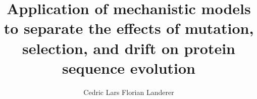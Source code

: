 \documentclass[dissertation,letterpaper,12pt]{utthesis} %
\title{Application of mechanistic models to separate the effects of mutation, selection, and drift on protein sequence evolution}	       	%
\author{Cedric Lars Florian Landerer}                			%
\begin{document}
  \newcommand{\package}{\textbf{AnaCoDa}\xspace} %
  \newcommand{\kluyveri}{\textit{L. kluyveri}\xspace}
  \newcommand{\dubl}{\textit{C. dubliniensis}\xspace}
  \newcommand{\gossypii}{\textit{E. gossypii}\xspace}
  \newcommand{\ROC}{ROC SEMPPR\xspace}
  \newcommand{\GC}{GC content\xspace}
  \newcommand{\DM}{\ensuremath{{\Delta M}}\xspace}
  \newcommand{\DE}{\ensuremath{{\Delta \eta}}\xspace}
  \newcommand{\Lik}{\ensuremath{\mathcal{L}}\xspace}
  \newcommand{\selac}{\emph{SelAC}\xspace}
  \newcommand{\selacDMS}{\emph{SelAC}+DMS\xspace}
  \newcommand{\phydms}{\emph{phydms}\xspace}
  \newcommand{\gy}{\emph{GY94}\xspace}
  \newcommand{\ecoli}{\textit{E. coli}\xspace}
  \newcommand{\PC}{physicochemical\xspace}  
  \newcommand{\DeltaAIC}{\ensuremath{\Delta\text{AIC}}\xspace}  
  \newcommand{\hb}{\emph{HB98}\xspace}



    \makeTitlePage %
    \setcounter{page}{2}
    \makeCopyrightPage %

    
    
    \doublespacing

    \tableofcontents %
    \listoftables %
    \listoffigures %
   
\end{document}
